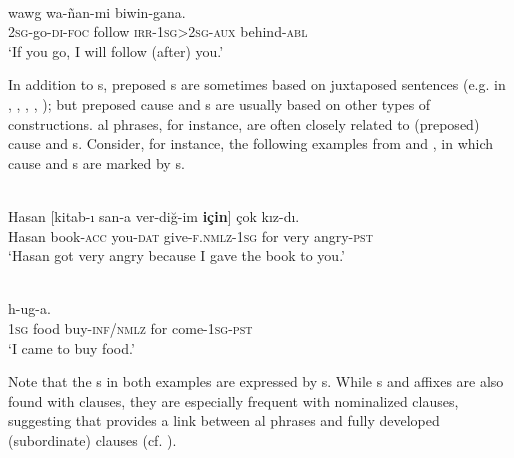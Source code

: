\documentclass[output=paper]{langsci/langscibook}
\begin{document}
\ea\label{ex:diessel:6}
\\
\gll   [ña-yaŋ-gu=\textbf{bayi}]   wawg   wa-ñan-mi  biwin-gana.\\
       \textsc{2sg}-go-\textsc{di-foc}    follow   \textsc{irr-1sg>2sg-aux}  behind-\textsc{abl}\\
\glt   `If you go, I will follow (after) you.'
\z

In addition to s, preposed s are sometimes based on juxtaposed sentences (e.g. in , , , , ); but preposed cause and s are usually based on other types of constructions. al phrases, for instance, are often closely related to (preposed) cause and s. Consider, for instance, the following examples from   and  , in which cause and s are marked by  s. 

\ea\label{ex:diessel:7}
\\
\gll   Hasan   [kitab-ı  san-a  ver-diğ-im  \textbf{için}]  çok  kız-dı.\\
       Hasan  book-\textsc{acc}  you-\textsc{dat}  give-\textsc{f.nmlz-1sg}  for  very  angry-\textsc{pst}  \\
\glt   `Hasan got very angry because I gave the book to you.'
\z

\ea\label{ex:diessel:8}
\\
  h-ug-a.\\
       \textsc{1sg}   food   buy-\textsc{inf/nmlz}  for  come-\textsc{1sg-pst}\\
\glt   `I came to buy food.'
\z

\noindent Note that the s in both examples are expressed by s. While s and  affixes are also found with  clauses, they are especially frequent with nominalized clauses, suggesting that  provides a link between al phrases and fully developed (subordinate) clauses (cf. \citealt{Deutscher2009,Heine2009}).
\end{document}
